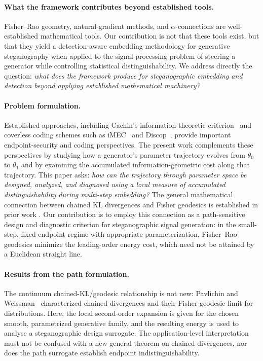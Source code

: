 \documentclass[a4paper,fleqn]{cas-dc}
\begin{document}
\paragraph{What the framework contributes beyond established tools.}
\label{subsec:beyond_tools}

Fisher--Rao geometry, natural-gradient methods, and $\alpha$-connections are
well-established mathematical tools.
Our contribution is not that these tools exist, but that they yield a
detection-aware embedding methodology for generative steganography when applied
to the signal-processing problem of steering a generator while controlling
statistical distinguishability.
We address directly the question: \emph{what does the framework produce for
steganographic embedding and detection beyond applying established mathematical
machinery?}

\paragraph{Problem formulation.}
Established approaches, including Cachin's information-theoretic criterion~\cite{cachin1998information}
and coverless coding schemes such as iMEC~\cite{imec2022} and Discop~\cite{discop2023},
provide important endpoint-security and coding perspectives. The present work
complements these perspectives by studying how a generator's parameter
trajectory evolves from $\theta_0$ to $\theta_1$ and by examining the
accumulated information-geometric cost along that trajectory.
This paper asks: \emph{how can the trajectory through parameter space
be designed, analyzed, and diagnosed using a local measure of
accumulated distinguishability during multi-step embedding?}
The general mathematical connection between chained KL divergences and
Fisher geodesics is established in prior work
\cite{pavlichin2016chained}. Our contribution is to employ this
connection as a path-sensitive design and diagnostic criterion for
steganographic signal generation:
in the small-step, fixed-endpoint regime with appropriate
parameterization, Fisher--Rao geodesics minimize the leading-order
energy cost, which need not be attained by a Euclidean straight line.

\paragraph{Results from the path formulation.}
The continuum chained-KL/geodesic relationship is not new:
Pavlichin and Weissman~\cite{pavlichin2016chained} characterized
chained divergences and their Fisher-geodesic limit for distributions.
Here, the local second-order expansion is given for the chosen
smooth, parametrized generative family, and the resulting energy is
used to analyse a steganographic design surrogate. The application-level
interpretation must not be confused with a new general theorem on
chained divergences, nor does the path surrogate establish
endpoint indistinguishability.
\end{document}
